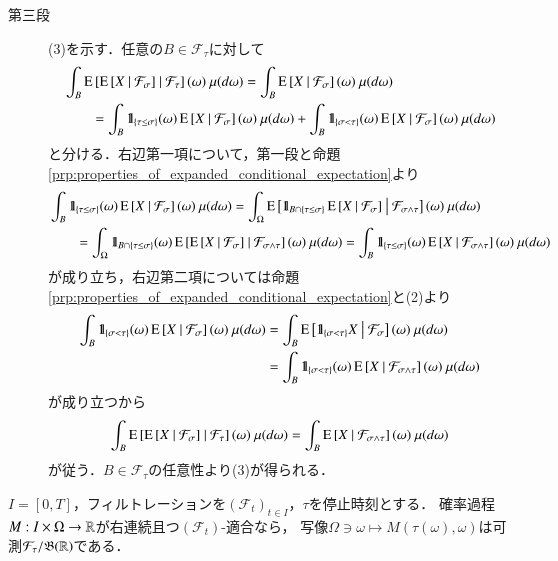 \begin{prf}
\begin{description}
			\item[第三段]
				(3)を示す．任意の$B \in \mathcal{F}_\tau$に対して
				\begin{align}
					&\int_B \cexp{\cexp{X}{\mathcal{F}_\sigma}}{\mathcal{F}_\tau}(\omega)\ \mu(d\omega)
					= \int_B \cexp{X}{\mathcal{F}_\sigma}(\omega)\ \mu(d\omega) \\
					&\qquad = \int_B \defunc_{\{\tau \leq \sigma\}}(\omega) \cexp{X}{\mathcal{F}_\sigma}(\omega)\ \mu(d\omega)
						+ \int_B \defunc_{\{\sigma < \tau\}}(\omega) \cexp{X}{\mathcal{F}_\sigma}(\omega)\ \mu(d\omega)
				\end{align}
				と分ける．右辺第一項について，第一段と命題\ref{prp:properties_of_expanded_conditional_expectation}より
				\begin{align}
					&\int_B \mbox{1}\hspace{-0.25em}\mbox{l}_{\{\tau \leq \sigma\}}(\omega) \operatorname{E} \left[ X \ \middle|\ \mathcal{F}_\sigma \right](\omega)\ \mu(d\omega)
					= \int_\Omega \operatorname{E} \left[ \mbox{1}\hspace{-0.25em}\mbox{l}_{B \cap \{\tau \leq \sigma\}} \operatorname{E} \left[ X \ \middle|\ \mathcal{F}_\sigma \right] \ \middle|\ \mathcal{F}_{\sigma \wedge \tau} \right](\omega)\ \mu(d\omega) \\
					&\qquad = \int_\Omega \mbox{1}\hspace{-0.25em}\mbox{l}_{B \cap \{\tau \leq \sigma\}}(\omega) \operatorname{E} \left[ \operatorname{E} \left[ X \ \middle|\ \mathcal{F}_\sigma \right] \ \middle|\ \mathcal{F}_{\sigma \wedge \tau} \right](\omega)\ \mu(d\omega)
					= \int_B \mbox{1}\hspace{-0.25em}\mbox{l}_{\{\tau \leq \sigma\}}(\omega) \operatorname{E} \left[ X \ \middle|\ \mathcal{F}_{\sigma \wedge \tau} \right](\omega)\ \mu(d\omega)
				\end{align}
				が成り立ち，右辺第二項については命題\ref{prp:properties_of_expanded_conditional_expectation}と(2)より
				\begin{align}
					\int_B \mbox{1}\hspace{-0.25em}\mbox{l}_{\{\sigma < \tau\}}(\omega) \operatorname{E} \left[ X \ \middle|\ \mathcal{F}_\sigma \right](\omega)\ \mu(d\omega)
					&= \int_B \operatorname{E} \left[ \mbox{1}\hspace{-0.25em}\mbox{l}_{\{\sigma < \tau\}} X \ \middle|\ \mathcal{F}_\sigma \right](\omega)\ \mu(d\omega) \\
					&= \int_B \mbox{1}\hspace{-0.25em}\mbox{l}_{\{\sigma < \tau\}}(\omega) \operatorname{E} \left[ X \ \middle|\ \mathcal{F}_{\sigma \wedge \tau} \right](\omega)\ \mu(d\omega)
				\end{align}
				が成り立つから
				\begin{align}
					\int_B \cexp{\cexp{X}{\mathcal{F}_\sigma}}{\mathcal{F}_\tau}(\omega)\ \mu(d\omega)
					= \int_B \cexp{X}{\mathcal{F}_{\sigma \wedge \tau}}(\omega)\ \mu(d\omega)
				\end{align}
				が従う．$B \in \mathcal{F}_\tau$の任意性より(3)が得られる．
				\QED
		\end{description}
	\end{prf}
	
	\begin{screen}
		\begin{thm}[停止時刻との合成写像の可測性]
			$I = [0,T]$，フィルトレーションを$(\mathcal{F}_t)_{t \in I}$，$\tau$を停止時刻とする．
			確率過程$M:I \times \Omega \rightarrow \mathbb{R}$が右連続且つ$(\mathcal{F}_t)$-適合なら，
			写像$\Omega \ni \omega \longmapsto M(\tau(\omega),\omega)$は可測$\mathcal{F}_\tau/\mathfrak{B}(\mathbb{R})$である．
			\label{thm:measurability_of_stopping_time}
		\end{thm}
	\end{screen}
	
